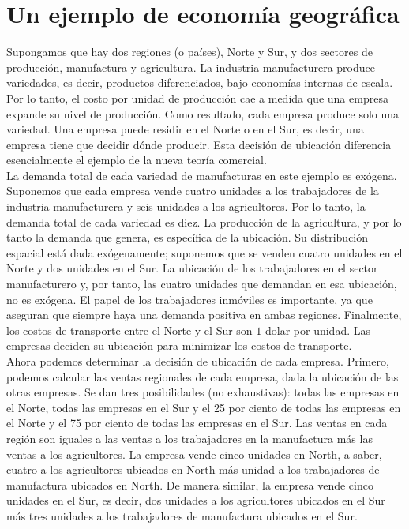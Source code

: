 \section{Un ejemplo de economía geográfica}
Supongamos que hay dos regiones (o países), Norte y Sur, y dos sectores de producción, manufactura y agricultura. La industria manufacturera produce variedades, es decir, productos diferenciados, bajo economías internas de escala. Por lo tanto, el costo por unidad de producción cae a medida que una empresa expande su nivel de producción. Como resultado, cada empresa produce solo una variedad. Una empresa puede residir en el Norte o en el Sur, es decir, una empresa tiene que decidir dónde producir. Esta decisión de ubicación diferencia esencialmente el ejemplo de la nueva teoría comercial.\\
La demanda total de cada variedad de manufacturas en este ejemplo es exógena. Suponemos que cada empresa vende cuatro unidades a los trabajadores de la industria manufacturera y seis unidades a los agricultores. Por lo tanto, la demanda total de cada variedad es diez. La producción de la agricultura, y por lo tanto la demanda que genera, es específica de la ubicación. Su distribución espacial está dada exógenamente; suponemos que se venden cuatro unidades en el Norte y dos unidades en el Sur. La ubicación de los trabajadores en el sector manufacturero y, por tanto, las cuatro unidades que demandan en esa ubicación, no es exógena. El papel de los trabajadores inmóviles es importante, ya que aseguran que siempre haya una demanda positiva en ambas regiones. Finalmente, los costos de transporte entre el Norte y el Sur son $1$ dolar por unidad. Las empresas deciden su ubicación para minimizar los costos de transporte.\\
Ahora podemos determinar la decisión de ubicación de cada empresa. Primero, podemos calcular las ventas regionales de cada empresa, dada la ubicación de las otras empresas. Se dan tres posibilidades (no exhaustivas): todas las empresas en el Norte, todas las empresas en el Sur y el 25 por ciento de todas las empresas en el Norte y el 75 por ciento de todas las empresas en el Sur. Las ventas en cada región son iguales a las ventas a los trabajadores en la manufactura más las ventas a los agricultores. La empresa vende cinco unidades en North, a saber, cuatro a los agricultores ubicados en North más  unidad a los trabajadores de manufactura ubicados en North. De manera similar, la empresa vende cinco unidades en el Sur, es decir, dos unidades a los agricultores ubicados en el Sur más tres unidades a los trabajadores de manufactura ubicados en el Sur.\\
